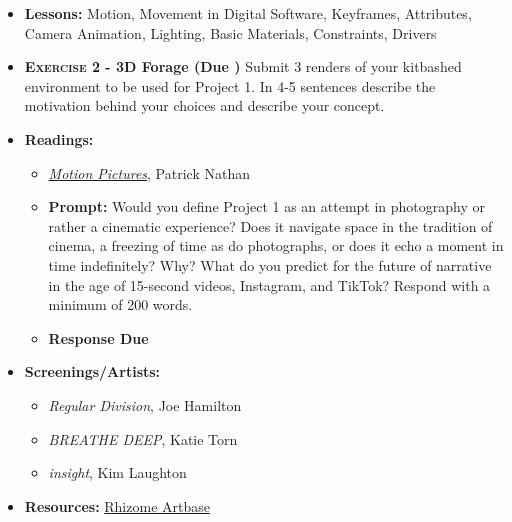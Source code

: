 \begin{itemize}[noitemsep,topsep=0pt,leftmargin=*]
    \item \textbf{Lessons:} Motion, Movement in Digital Software, Keyframes, Attributes, Camera Animation, Lighting, Basic Materials, Constraints, Drivers
    \item \textbf{\textsc{Exercise 2} - 3D Forage (Due \dTues)} Submit 3 renders of your kitbashed environment to be used for Project 1. In 4-5 sentences describe the motivation behind your choices and describe your concept.
    \item \textbf{Readings:}
          \begin{itemize}
              \item \href{https://reallifemag.com/motion-pictures/}{\emph{Motion Pictures}}, Patrick Nathan
              \item \textbf{Prompt:} Would you define Project 1 as an attempt in photography or rather a cinematic experience? Does it navigate space in the tradition of cinema, a freezing of time as do photographs, or does it echo a moment in time indefinitely? Why? What do you predict for the future of narrative in the age of 15-second videos, Instagram, and TikTok? Respond with a minimum of 200 words.
              \item \textbf{Response Due \dThur}
          \end{itemize}
    \item \textbf{Screenings/Artists:}
          \begin{itemize}
              \item \emph{Regular Division}, Joe Hamilton
              \item \emph{BREATHE DEEP}, Katie Torn
              \item \emph{insight}, Kim Laughton
          \end{itemize}
    \item \textbf{Resources:} \href{https://rhizome.org/art/artbase/}{Rhizome Artbase}
\end{itemize}